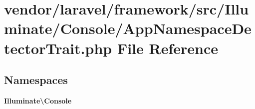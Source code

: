 \section{vendor/laravel/framework/src/\+Illuminate/\+Console/\+App\+Namespace\+Detector\+Trait.php File Reference}
\label{_app_namespace_detector_trait_8php}
\subsection*{Namespaces}
\begin{DoxyCompactItemize}
\item 
 {\bf Illuminate\textbackslash{}\+Console}
\end{DoxyCompactItemize}
